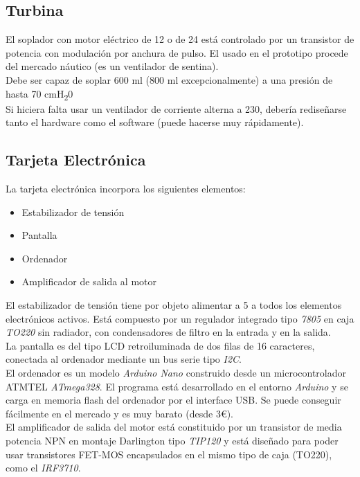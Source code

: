 \subsection{Turbina}
    El soplador con motor eléctrico de 12 \Vcc o de 24 \Vcc está controlado por un transistor de potencia con modulación por anchura de pulso. El usado en el prototipo procede del mercado náutico (es un ventilador de sentina).\\
    Debe ser capaz de soplar 600 ml (800 ml excepcionalmente) a una presión de hasta 70 cmH\textsubscript{2}0\\
    Si hiciera falta usar un ventilador de corriente alterna a 230\Vca, debería rediseñarse tanto el hardware como el software (puede hacerse muy rápidamente).
\subsection{Tarjeta Electrónica}
    La tarjeta electrónica incorpora los siguientes elementos:
    \begin{itemize}
        \item Estabilizador de tensión
        \item Pantalla
        \item Ordenador
        \item Amplificador de salida al motor
    \end{itemize}
    El estabilizador de tensión tiene por objeto alimentar a 5 \Vcc a todos los elementos electrónicos activos. Está compuesto por un regulador integrado tipo \textit{7805} en caja \textit{TO220} sin radiador, con condensadores de filtro en la entrada y en la salida.\\

    La pantalla es del tipo LCD retroiluminada de dos filas de 16 caracteres, conectada al ordenador mediante un bus serie tipo \textit{I2C}.\\
    
    El ordenador es un modelo \textit{Arduino Nano} construido desde un microcontrolador ATMTEL \textit{ATmega328}. El     programa está desarrollado en el entorno \textit{Arduino} y se carga en memoria flash del ordenador por el interface USB. Se puede conseguir fácilmente en el mercado y es muy barato (desde 3€).\\
    
    El amplificador de salida del motor está constituido por un transistor de media potencia NPN en montaje Darlington tipo \textit{TIP120} y está diseñado para poder usar transistores FET-MOS encapsulados en el mismo tipo de caja (TO220), como el \textit{IRF3710}.
    
